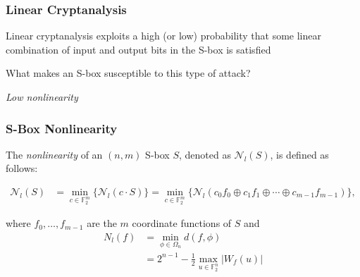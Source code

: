 \documentclass[handout,10pt]{beamer}
\begin{document}
\begin{frame}
	\frametitle{Linear Cryptanalysis}
	Linear cryptanalysis exploits a high (or low) probability that some linear combination of input and output bits in the S-box is satisfied

	\medskip
	\pause

	What makes an S-box susceptible to this type of attack?

	\pause 
	\medskip

	\begin{center}
		\emph{Low nonlinearity}
	\end{center}


\end{frame}



\begin{frame}
	\frametitle{S-Box Nonlinearity}
	The \emph{nonlinearity} of an $(n, m)$ S-box $S$, denoted as $\mathcal{N}_l(S)$, is defined as follows:

	\begin{align*}
		\mathcal{N}_l(S) & = \min_{c \in \mathbb{F}_2^m}\{\mathcal{N}_l(c \cdot S)\} = \min_{c \in \mathbb{F}_2^m}\{\mathcal{N}_l(c_0f_0 \oplus c_1f_1 \oplus \dotsb \oplus c_{m-1}f_{m-1})\},
	\end{align*}
	
	\medskip

	where $f_0,\dots,f_{m-1}$ are the $m$ coordinate functions of $S$ and 
	\begin{align*}
		N_l(f) & = \min_{\phi \in \Omega_n} d(f, \phi)\\
		& = 2^{n-1} - \frac{1}{2}\max_{u \in \mathbb{F}_2^n}|W_f(u)|
	\end{align*}
\end{frame}

\end{document}
